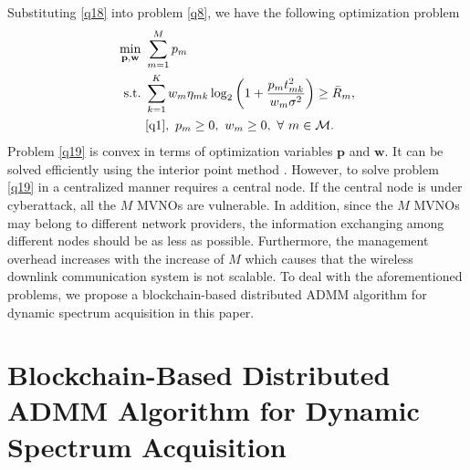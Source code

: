 \documentclass[journal]{IEEEtran}
\begin{document}
Substituting \eqref{q18} into problem \eqref{q8}, we have the following optimization problem
\begin{align}\label{q19}
\min_{\mathbf{p}, \mathbf{w}}\ & \sum\limits_{m=1}^{M} p_m \nonumber\\
\mbox{s.t.}\ &\sum\limits_{k= 1}^{K}w_m \eta_{mk}\log_2\left(1 + \frac{p_mt_{mk}^2}{w_m\sigma^2}\right)\geq \bar{R}_m,\nonumber\\
&\eqref{q1},\ p_m \geq 0,\ w_m \geq 0,\ \forall\ m\in\mathcal{M}.
\end{align}
Problem \eqref{q19} is convex in terms of optimization variables $\mathbf{p}$ and $\mathbf{w}$. It can be solved efficiently using the interior point method \cite{SBoyd1}. However, to solve problem \eqref{q19} in a centralized manner requires a central node. If the central node is under cyberattack, all the $M$ MVNOs are vulnerable. In addition, since the $M$ MVNOs may belong to different network providers, the information exchanging among different nodes should be as less as possible. Furthermore, the management overhead increases with the increase of $M$ which causes that the wireless downlink communication system is not scalable. To deal with the aforementioned problems, we propose a blockchain-based distributed ADMM algorithm \cite{SBoyd2,EChen} for dynamic spectrum acquisition in this paper.

\section{Blockchain-Based Distributed ADMM Algorithm for Dynamic Spectrum Acquisition}
\end{document}
